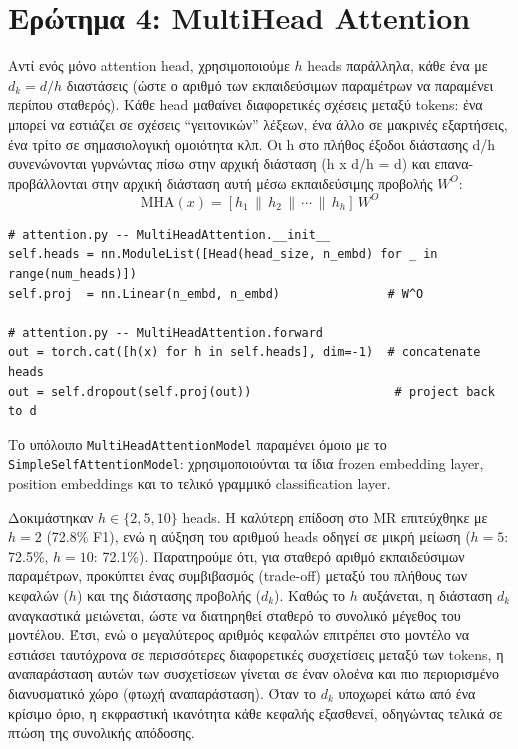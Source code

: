 \documentclass[12pt]{article}
\begin{document}
\section{Ερώτημα 4: MultiHead Attention}

Αντί ενός μόνο attention head, χρησιμοποιούμε $h$ heads
παράλληλα, κάθε ένα με $d_k = d / h$ διαστάσεις (ώστε ο αριθμό των εκπαιδεύσιμων παραμέτρων να παραμένει περίπου σταθερός).
Κάθε head μαθαίνει διαφορετικές σχέσεις μεταξύ tokens:
ένα μπορεί να εστιάζει σε σχέσεις ``γειτονικών'' λέξεων,
ένα άλλο σε μακρινές εξαρτήσεις, ένα τρίτο σε σημασιολογική
ομοιότητα κλπ. Οι h στο πλήθος έξοδοι διάστασης d/h συνενώνονται γυρνώντας πίσω στην αρχική διάσταση (h x d/h = d) και επανα-προβάλλονται
στην αρχική διάσταση αυτή μέσω εκπαιδεύσιμης προβολής $W^O$:
\[
    \text{MHA}(x) = [h_1 \,\|\, h_2 \,\|\, \cdots \,\|\, h_h] \, W^O
\]

\begin{lstlisting}[basicstyle=\ttfamily\footnotesize]
# attention.py -- MultiHeadAttention.__init__
self.heads = nn.ModuleList([Head(head_size, n_embd) for _ in range(num_heads)])
self.proj  = nn.Linear(n_embd, n_embd)               # W^O

# attention.py -- MultiHeadAttention.forward
out = torch.cat([h(x) for h in self.heads], dim=-1)  # concatenate heads
out = self.dropout(self.proj(out))                    # project back to d
\end{lstlisting}

Το υπόλοιπο \texttt{MultiHeadAttentionModel} παραμένει όμοιο
με το \texttt{SimpleSelfAttentionModel}: χρησιμοποιούνται τα ίδια frozen embedding layer,
position embeddings και το τελικό γραμμικό classification layer.



Δοκιμάστηκαν $h \in \{2, 5, 10\}$ heads. Η καλύτερη επίδοση στο MR
επιτεύχθηκε με $h = 2$ (72.8\% F1), ενώ η αύξηση του αριθμού heads
οδηγεί σε μικρή μείωση ($h=5$: 72.5\%, $h=10$: 72.1\%). Παρατηρούμε ότι, για σταθερό αριθμό εκπαιδεύσιμων παραμέτρων, προκύπτει ένας συμβιβασμός (trade-off) μεταξύ του πλήθους των κεφαλών ($h$) και της διάστασης προβολής ($d_k$). Καθώς το $h$ αυξάνεται, η διάσταση $d_k$ αναγκαστικά μειώνεται, ώστε να διατηρηθεί σταθερό το συνολικό μέγεθος του μοντέλου. Έτσι, ενώ ο μεγαλύτερος αριθμός κεφαλών επιτρέπει στο μοντέλο να εστιάσει ταυτόχρονα σε περισσότερες διαφορετικές συσχετίσεις μεταξύ των tokens, η αναπαράσταση αυτών των συσχετίσεων γίνεται σε έναν ολοένα και πιο περιορισμένο διανυσματικό χώρο (φτωχή αναπαράσταση). Όταν το $d_k$ υποχωρεί κάτω από ένα κρίσιμο όριο, η εκφραστική ικανότητα κάθε κεφαλής εξασθενεί, οδηγώντας τελικά σε πτώση της συνολικής απόδοσης.
\end{document}
